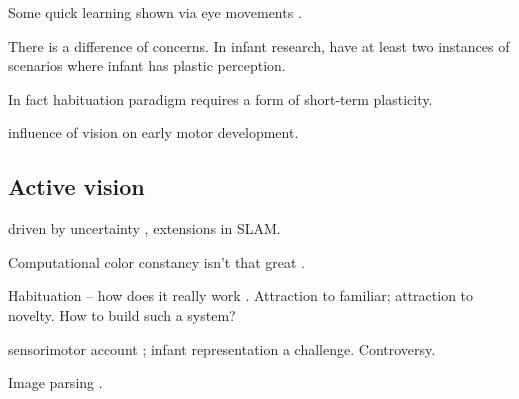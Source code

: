 Some quick learning shown via eye movements \cite{johnson03development}.


There is a difference of concerns.  In infant research, have
at least two instances of scenarios where infant has
plastic perception.

In fact habituation paradigm requires a form of short-term
plasticity. 


\cite{prechtl01role} influence of vision on early motor 
development.

\subsection{Active vision}

\cite{bajcsy88active,aloimonos87active,ballard91animate}

driven by uncertainty \cite{whaite97autonomous}, 
extensions in SLAM.

Computational color constancy isn't that great
\cite{barnard02comparison}.

Habituation -- how does it really work \cite{sirois02models}.
Attraction to familiar; attraction to novelty.
How to build such a system?

sensorimotor account \cite{oregan01sensorimotor};
infant representation a challenge.  Controversy.

Image parsing \cite{tu05image}.


\newpage

\ 

\newpage

